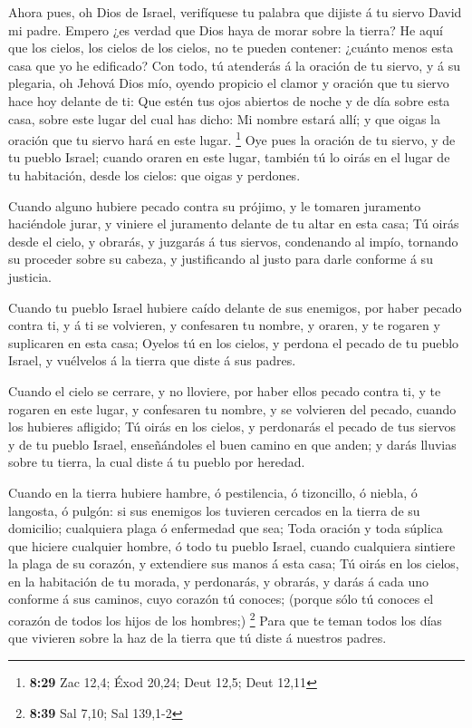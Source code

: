  Ahora pues, oh Dios de Israel, verifíquese tu palabra que
dijiste á tu siervo David mi padre.  Empero ¿es verdad que
Dios haya de morar sobre la tierra? He aquí que los cielos, los cielos
de los cielos, no te pueden contener: ¿cuánto menos esta casa que yo he
edificado?  Con todo, tú atenderás á la oración de tu
siervo, y á su plegaria, oh Jehová Dios mío, oyendo propicio el clamor y
oración que tu siervo hace hoy delante de ti:  Que estén
tus ojos abiertos de noche y de día sobre esta casa, sobre este lugar
del cual has dicho: Mi nombre estará allí; y que oigas la oración que tu
siervo hará en este lugar. \footnote{\textbf{8:29} Zac 12,4; Éxod 20,24;
  Deut 12,5; Deut 12,11}  Oye pues la oración de tu siervo,
y de tu pueblo Israel; cuando oraren en este lugar, también tú lo oirás
en el lugar de tu habitación, desde los cielos: que oigas y perdones.

 Cuando alguno hubiere pecado contra su prójimo, y le
tomaren juramento haciéndole jurar, y viniere el juramento delante de tu
altar en esta casa;  Tú oirás desde el cielo, y obrarás, y
juzgarás á tus siervos, condenando al impío, tornando su proceder sobre
su cabeza, y justificando al justo para darle conforme á su justicia.

 Cuando tu pueblo Israel hubiere caído delante de sus
enemigos, por haber pecado contra ti, y á ti se volvieren, y confesaren
tu nombre, y oraren, y te rogaren y suplicaren en esta casa;
 Oyelos tú en los cielos, y perdona el pecado de tu pueblo
Israel, y vuélvelos á la tierra que diste á sus padres.

 Cuando el cielo se cerrare, y no lloviere, por haber ellos
pecado contra ti, y te rogaren en este lugar, y confesaren tu nombre, y
se volvieren del pecado, cuando los hubieres afligido;  Tú
oirás en los cielos, y perdonarás el pecado de tus siervos y de tu
pueblo Israel, enseñándoles el buen camino en que anden; y darás lluvias
sobre tu tierra, la cual diste á tu pueblo por heredad.

 Cuando en la tierra hubiere hambre, ó pestilencia, ó
tizoncillo, ó niebla, ó langosta, ó pulgón: si sus enemigos los tuvieren
cercados en la tierra de su domicilio; cualquiera plaga ó enfermedad que
sea;  Toda oración y toda súplica que hiciere cualquier
hombre, ó todo tu pueblo Israel, cuando cualquiera sintiere la plaga de
su corazón, y extendiere sus manos á esta casa;  Tú oirás
en los cielos, en la habitación de tu morada, y perdonarás, y obrarás, y
darás á cada uno conforme á sus caminos, cuyo corazón tú conoces;
(porque sólo tú conoces el corazón de todos los hijos de los hombres;)
\footnote{\textbf{8:39} Sal 7,10; Sal 139,1-2}  Para que te
teman todos los días que vivieren sobre la haz de la tierra que tú diste
á nuestros padres.


